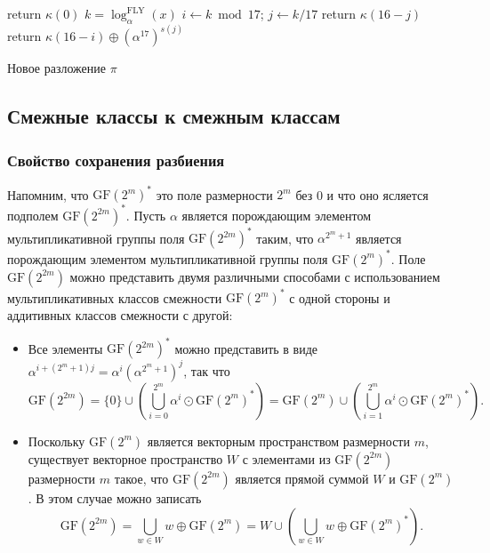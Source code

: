 \begin{algorithm}[htp!]
     {
      return $\kappa(0)$\;
    }{
      $k = \log_{\alpha}^{\text{FLY}}(x)$\;
      $i \gets k \bmod 17$; \quad $j \gets k/17 $ 
       { 
        return $\kappa(16 - j)$ 
      }{
        return $\kappa(16 - i) \oplus (\alpha^{17})^{s(j)}$ 
      }
    }
  \caption{Новое разложение \(\pi\)}
  \label{alg:alg01}
\end{algorithm}

\subsection{Смежные классы к смежным классам}

\subsubsection{Свойство сохранения разбиения}

Напомним, что \(\mathrm{GF}(2^m)^*\) это поле размерности \(2^m\) без 0 и что оно ясляется подполем \(\mathrm{GF}(2^{2m})^*\). Пусть \(\alpha\) является порождающим элементом мультипликативной группы поля \(\mathrm{GF}(2^{2m})^*\) таким, что \(\alpha^{2^m+1}\) является порождающим элементом мультипликативной группы поля \(\mathrm{GF}(2^m)^*\). Поле \(\mathrm{GF}(2^{2m})\) можно представить двумя различными способами с использованием мультипликативных классов смежности \(\mathrm{GF}(2^m)^*\) с одной стороны и аддитивных классов смежности с другой:

\begin{itemize}
  \item Все элементы \(\mathrm{GF}(2^{2m})^*\) можно представить в виде \(\alpha^{i+(2^m+1)j} = \alpha^i (\alpha^{2^m+1})^j\), так что
  \[
  \mathrm{GF}(2^{2m}) = \{0\} \cup \left(\bigcup_{i=0}^{2^m} \alpha^i \odot \mathrm{GF}(2^m)^*\right) = \mathrm{GF}(2^m) \cup \left(\bigcup_{i=1}^{2^m} \alpha^i \odot \mathrm{GF}(2^m)^*\right).
  \]
  \item Поскольку \(\mathrm{GF}(2^m)\) является векторным пространством размерности \(m\), существует векторное пространство \(W\) с элементами из \(\mathrm{GF}(2^{2m})\) размерности \(m\) такое, что \(\mathrm{GF}(2^{2m})\) является прямой суммой \(W\) и \(\mathrm{GF}(2^m)\). В этом случае можно записать
  \[
  \mathrm{GF}(2^{2m}) = \bigcup_{w \in W} w \oplus \mathrm{GF}(2^m) = W \cup \left(\bigcup_{w \in W} w \oplus \mathrm{GF}(2^m)^*\right).
  \]
\end{itemize}

